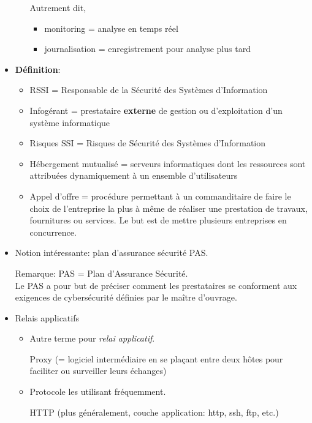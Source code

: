 \documentclass[a4paper]{article}
\begin{document}
\begin{itemize}
\begin{itemize}
\begin{example}
        Autrement dit,
        \begin{itemize}
            \item monitoring = analyse en temps réel
            \item journalisation = enregistrement pour analyse plus tard
        \end{itemize}
    \end{example}
\end{itemize}





\item \textbf{Définition}:
\begin{itemize}
    \item RSSI = Responsable de la Sécurité des Systèmes d'Information
    \item Infogérant = prestataire \textbf{externe} de gestion ou d'exploitation d'un système informatique
    \item Risques SSI = Risques de Sécurité des Systèmes d'Information
    \item Hébergement mutualisé = serveurs informatiques dont les ressources sont attribuées dynamiquement à un ensemble d'utilisateurs
    \item Appel d’offre = procédure permettant à un commanditaire de faire le choix de l'entreprise la plus à même de réaliser une prestation de travaux, fournitures ou services. Le but est de mettre plusieurs entreprises en concurrence.
\end{itemize}





\item Notion intéressante: plan d’assurance sécurité PAS.
\begin{example}
    Remarque: PAS = Plan d'Assurance Sécurité. \\
    Le PAS a pour but de préciser comment les prestataires se conforment aux exigences de cybersécurité définies par le maître d’ouvrage.
\end{example}





\item Relais applicatifs
\begin{itemize}
    \item Autre terme pour \textit{relai applicatif}.
    \begin{example}
        Proxy (= logiciel intermédiaire en se plaçant entre deux hôtes pour faciliter ou surveiller leurs échanges)
    \end{example}
    \item Protocole les utilisant fréquemment.
    \begin{example}
        HTTP (plus généralement, couche application: http, ssh, ftp, etc.)
    \end{example}
\end{itemize}






\end{itemize}
\end{document}
